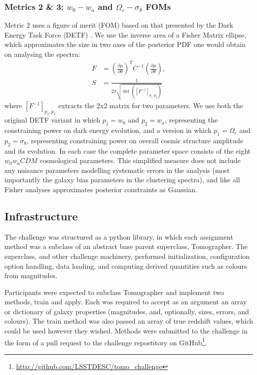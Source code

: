 \documentclass[twocolumn,twocolappendix]{aastex63}
\begin{document}
\subsubsection{Metrics 2 \& 3: $w_{0}-w_{a}$ and $\Omega_c-\sigma_8$ FOMs}

Metric 2 uses a figure of merit (FOM) based on that presented by the Dark Energy Task Force (DETF) \citep{detf}.  We 
use the inverse area of a Fisher Matrix ellipse, which approximates the size in two axes 
of the posterior PDF one would obtain on analysing the spectra:
\begin{align}
    F &= \left( \frac{\partial \mu}{\partial \theta} \right)^T C^{-1} \left( \frac{\partial \mu}{\partial \theta} \right), \\
    S &= \frac{1}{2 \pi \sqrt{\det{([F^{-1}]_{p_1, p_2})}}}
\label{eq:fom}
\end{align}
where $[F^{-1}]_{p_1, p_2}$ extracts the 2x2 matrix for two parameters.  We use both the original
DETF variant in which $p_1 = w_0$ and $p_2 = w_a$, representing the constraining power on dark energy 
evolution, and a version in which $p_1 = \Omega_c$ and $p_2 = \sigma_8$, representing constraining
power on overall cosmic structure amplitude and its evolution. In each case the complete parameter space consists
of the eight $w_0w_aCDM$ cosmological parameters. This simplified measure does not include any nuisance
parameters modelling systematic errors in the analysis (most importantly the galaxy bias parameters in the clustering 
spectra), and like all Fisher analyses approximates posterior constraints as Gaussian. 

\subsection{Infrastructure}

The challenge was structured as a python library, in which each assignment
method was a subclass of an abstract base parent superclass, {\sc Tomographer}.
The superclass, and other challenge machinery, performed initialization,
configuration option handling, data loading, and computing derived quantities
such as colours from magnitudes.

Participants were expected to subclass
{\sc Tomographer} and implement two methods, {\sc train} and {\sc apply}.  Each
was required to accept as an argument an array or dictionary of galaxy properties
(magnitudes, and, optionally, sizes, errors, and colours).  The {\sc train} method
was also passed an array of true redshift values, which could be used however they wished.
Methods were submitted to the challenge in the form of a pull request to the challenge
repostitory on GitHub\footnote{\url{http://github.com/LSSTDESC/tomo_challenge}}.
\end{document}
